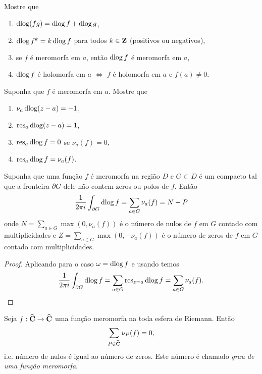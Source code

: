 \begin{problema}
\label{p:dlog}
Mostre que
\begin{enumerate}
\item $\operatorname{dlog} (fg) = \operatorname{dlog} f + \operatorname{dlog} g$,
\item $\operatorname{dlog} f^k = k \operatorname{dlog} f$ para todos $k\in\mathbf{Z}$ (positivos ou negativos),
\item se $f$ é meromorfa em $a$, então $\operatorname{dlog} f$ é meromorfa em $a$,
\item $\operatorname{dlog} f$ é holomorfa em $a$ $\iff$ $f$ é holomorfa em $a$ e $f(a)\neq 0$.
\end{enumerate}
Suponha que $f$ é meromorfa em $a$. Mostre que
\begin{enumerate}
\item $\nu_a \operatorname{dlog}(z-a) = -1$,
\item $\operatorname{res}_a \operatorname{dlog}(z-a) = 1$,
\item $\operatorname{res}_a \operatorname{dlog} f = 0$ se $\nu_a(f) = 0$,
\item $\operatorname{res}_a \operatorname{dlog} f = \nu_a(f)$.
\end{enumerate}
\end{problema}

\begin{teorema}
\label{t:dlog-val}
Suponha que uma função $f$ é meromorfa na região $D$ e $G\subset D$
é um compacto tal que a fronteira $\partial G$ dele não contem zeros ou polos de $f$. Então
\begin{equation}
\label{eq:dlog-val}
\frac{1}{2\pi i} \int_{\partial G} \operatorname{dlog} f = \sum_{a\in G} \nu_a(f) = N-P
\end{equation}
onde $N = \sum_{a\in G} \max(0,\nu_a(f))$ é o número de nulos de $f$ em $G$ contado com multiplicidades
e $Z = \sum_{a\in G} \max(0,-\nu_a(f))$ é o número de zeros de $f$ em $G$ contado com multiplicidades.
\end{teorema}
\begin{proof}
Aplicando  para o caso $\omega = \operatorname{dlog} f$ e usando  temos
\[ \frac{1}{2\pi i} \int_{\partial G} \operatorname{dlog} f = \sum_{a\in G} \operatorname{res}_{z=a} \operatorname{dlog} f = \sum_{a\in G} \nu_a(f). \]
\end{proof}

\begin{cor}
Seja $f : \widehat{\mathbf{C}} \to \widehat{\mathbf{C}}$ uma função meromorfa na toda esfera de Riemann. Então
\begin{equation}
\sum_{P\in\widehat{\mathbf{C}}} \nu_P(f) = 0,
\end{equation}
i.e. número de nulos é igual ao número de zeros. Este número é chamado \emph{grau de uma função meromorfa}.
\end{cor}

